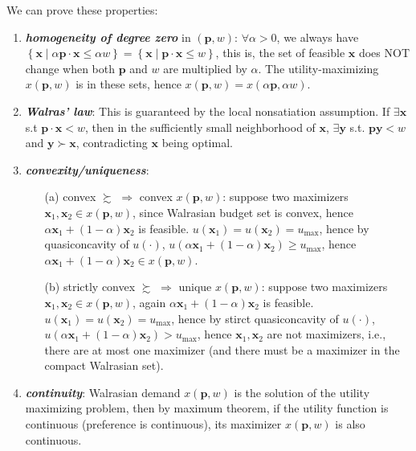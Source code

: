 We can prove these properties: 
\begin{enumerate}
    \item \textit{\textbf{homogeneity of degree zero}} in $(\mathbf{p},w)$: $\forall \alpha >0$, we always have $\left\{\mathbf{x}\mid \alpha\mathbf{p}\cdot\mathbf{x}\leq \alpha w\right\}=\left\{\mathbf{x}\mid \mathbf{p}\cdot\mathbf{x}\leq w\right\}$, this is, the set of feasible $\mathbf{x}$ does NOT change when both $\mathbf{p}$ and $w$ are multiplied by $\alpha$. The utility-maximizing $ x(\mathbf{p},w)$ is in these sets, hence $ x(\mathbf{p},w)= x(\alpha\mathbf{p},\alpha w)$.
    \item \textit{\textbf{Walras' law}}: This is guaranteed by the local nonsatiation assumption. If $\exists \mathbf{x}$ s.t $\mathbf{p}\cdot \mathbf{x}<w$, then in the sufficiently small neighborhood of $\mathbf{x}$, $\exists\mathbf{y}$ s.t. $\mathbf{p}\mathbf{y}<w$ and $\mathbf{y}\succ \mathbf{x}$, contradicting $\mathbf{x}$ being optimal.
    \item \textit{\textbf{convexity/uniqueness}}:
    \begin{enumerate}
        \item[(a)] convex $\succsim$ $\Rightarrow$ convex $ x(\mathbf{p},w)$: suppose two maximizers $\mathbf{x}_1,\mathbf{x}_2\in x(\mathbf{p},w)$, since Walrasian budget set is convex, hence $\alpha \mathbf{x}_1+(1-\alpha)\mathbf{x}_2$ is feasible. $u(\mathbf{x}_1)=u(\mathbf{x}_2)=u_{\max}$, hence by quasiconcavity of $u(\cdot)$, $u(\alpha \mathbf{x}_1+(1-\alpha)\mathbf{x}_2)\geq u_{\max}$, hence $\alpha \mathbf{x}_1+(1-\alpha)\mathbf{x}_2\in  x(\mathbf{p},w)$.
        \item[(b)] strictly convex $\succsim$ $\Rightarrow$ unique $ x(\mathbf{p},w)$: suppose two maximizers $\mathbf{x}_1,\mathbf{x}_2\in x(\mathbf{p},w)$, again $\alpha \mathbf{x}_1+(1-\alpha)\mathbf{x}_2$ is feasible. $u(\mathbf{x}_1)=u(\mathbf{x}_2)=u_{\max}$, hence by stirct quasiconcavity of $u(\cdot)$, $u(\alpha \mathbf{x}_1+(1-\alpha)\mathbf{x}_2)> u_{\max}$, hence $\mathbf{x}_1,\mathbf{x}_2$ are not maximizers, i.e., there are at most one maximizer (and there must be a maximizer in the compact Walrasian set).
    \end{enumerate}
    \item \textit{\textbf{continuity}}: Walrasian demand $ x(\mathbf{p},w)$ is the solution of the utility maximizing problem, then by maximum theorem, if the utility function is continuous (preference is continuous), its maximizer $ x(\mathbf{p},w)$ is also continuous. 
    

\end{enumerate}
